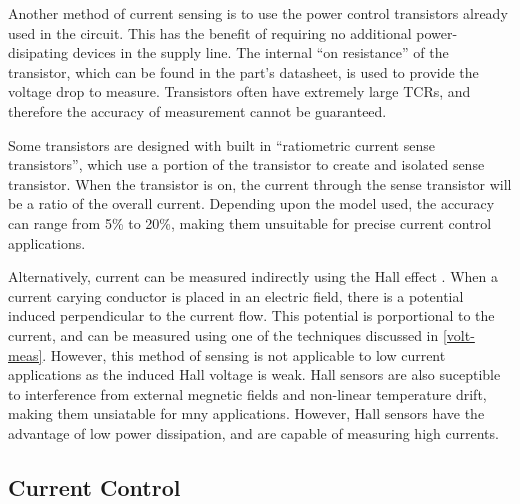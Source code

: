 Another method of current sensing is to use the power control transistors already used in the circuit. This has the benefit of requiring no additional power-disipating devices in the supply line. The internal ``on resistance'' of the transistor, which can be found in the part's datasheet, is used to provide the voltage drop to measure. Transistors often have extremely large TCRs, and therefore the accuracy of measurement cannot be guaranteed. 

Some transistors are designed with built in ``ratiometric current sense transistors'', which use a portion of the transistor to create and isolated sense transistor. When the transistor is on, the current through the sense transistor will be a ratio of the overall current. Depending upon the model used, the accuracy can range from 5\% to 20\%, making them unsuitable for precise current control applications.

Alternatively, current can be measured indirectly using the Hall effect \cite{hall}. When a current carying conductor is placed in an electric field, there is a potential induced perpendicular to the current flow. This potential is porportional to the current, and can be measured using one of the techniques discussed in \ref{volt-meas}. However, this method of sensing is not applicable to low current applications as the induced Hall voltage is weak. Hall sensors are also suceptible to interference from external megnetic fields and non-linear temperature drift, making them unsiatable for mny applications. However, Hall sensors have the advantage of low power dissipation, and are capable of measuring high currents.

\subsection{Current Control}